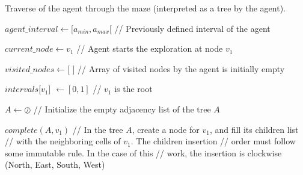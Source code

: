 \begin{algorithm}
\caption{Traverse of the agent through the maze (interpreted as a tree by the agent).}
\label{pseudocode_1}
\begin{algorithmic}


\State $agent\_interval \gets [a_{min},a_{max}[$ \hspace{0.5cm} \slash\slash \hspace{0.1cm} Previously defined interval of the agent

\State $current\_node \gets v_{1}$ \hspace{1cm} \slash\slash \hspace{0.1cm} Agent starts the exploration at node $v_{1}$

\State $visited\_nodes \gets [$ $]$ \hspace{0.95cm} \slash\slash \hspace{0.1cm} Array of visited nodes by the agent is initially empty

\State $intervals[v_{1}$] $\gets [0,1]$ \hspace{0.65cm} \slash\slash \hspace{0.1cm} $v_{1}$ is the root


\State $A \gets \oslash$ \hspace{3.1cm} \slash\slash \hspace{0.1cm} Initialize the empty adjacency list of the tree $A$

\State $complete(A, v_{1})$ \hspace{1.55cm} \slash\slash \hspace{0.1cm} In the tree $A$, create a node for $v_{1}$, and fill its children list
\State \hspace{4.45cm} \slash\slash \hspace{0.1cm} with the neighboring cells of $v_{1}$. The children insertion
\State \hspace{4.45cm} \slash\slash \hspace{0.1cm} order must follow some immutable rule. In the case of this
\State \hspace{4.45cm} \slash\slash \hspace{0.1cm} work, the insertion is clockwise (North, East, South, West)\\


\end{algorithmic}
\end{algorithm}
